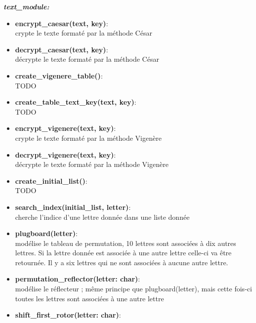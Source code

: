 \documentclass[a4paper,12pt,abstracton,titlepage]{scrartcl}
\begin{document}
\newpage
\textit{\textbf{text\_module:}}\vspace{0.2cm}
\begin{itemize}
\item \textbf{encrypt\_caesar(text, key)}:\\
crypte le texte formaté par la méthode César\\
\item \textbf{decrypt\_caesar(text, key)}:\\
décrypte le texte formaté par la méthode César\\
\item \textbf{create\_vigenere\_table()}:\\
TODO\\
\item \textbf{create\_table\_text\_key(text, key)}:\\
TODO\\
\item \textbf{encrypt\_vigenere(text, key)}:\\
crypte le texte formaté par la méthode Vigenère\\
\item \textbf{decrypt\_vigenere(text, key)}:\\
décrypte le texte formaté par la méthode Vigenère\\
\item \textbf{create\_initial\_list()}:\\
TODO\\
\item \textbf{search\_index(initial\_list, letter)}:\\
cherche l'indice d'une lettre donnée dans une liste donnée\\
\item \textbf{plugboard(letter)}:\\
modélise le tableau de permutation, 10 lettres sont associées à dix autres lettres. Si la lettre donnée est associée à une autre lettre celle-ci va être retournée. Il y a six lettres qui ne sont associées à aucune autre lettre.\\
\item \textbf{permutation\_reflector(letter: char)}:\\
modélise le réflecteur ; même principe que plugboard(letter), mais cette fois-ci toutes les lettres sont associées à une autre lettre\\
\item \textbf{shift\_first\_rotor(letter: char)}:\\

\end{itemize}
\end{document}
